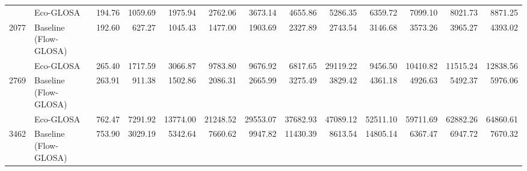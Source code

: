 \begin{table}[ht]
{\begin{tabular}{llrrrrrrrrrrr}
        \addlinespace
        2077 & Eco-GLOSA                    &  194.76 & 1059.69 & 1975.94 & 2762.06 & 3673.14 & 4655.86 & 5286.35 & 6359.72 & 7099.10 & 8021.73 & 8871.25 \\
        2077 & Baseline (Flow-GLOSA)        &  192.60 &  627.27 & 1045.43 & 1477.00 & 1903.69 & 2327.89 & 2743.54 & 3146.68 & 3573.26 & 3965.27 & 4393.02 \\
        \addlinespace
        2769 & Eco-GLOSA                    &  265.40 & 1717.59 & 3066.87 & 9783.80 & 9676.92 & 6817.65 & 29119.22 & 9456.50 & 10410.82 & 11515.24 & 12838.56 \\
        2769 & Baseline (Flow-GLOSA)        &  263.91 &  911.38 & 1502.86 & 2086.31 & 2665.99 & 3275.49 & 3829.42 & 4361.18 & 4926.63 & 5492.37 & 5976.06 \\
        \addlinespace
        3462 & Eco-GLOSA                    &  762.47 & 7291.92 &13774.00 &21248.52 &29553.07 &37682.93 &47089.12 &52511.10 &59711.69 &62882.26 &64860.61 \\
        3462 & Baseline (Flow-GLOSA)        &  753.90 & 3029.19 & 5342.64 & 7660.62 & 9947.82 &11430.39 & 8613.54 &14805.14 & 6367.47 & 6947.72 & 7670.32 \\
        \bottomrule
      \end{tabular}
    }
\end{table}

